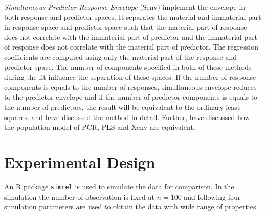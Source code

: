 \documentclass[12pt,3p,authoryear]{elsarticle}
\begin{document}
\emph{Simultaneous Predictor-Response Envelope} (Senv) implement the
envelope in both response and predictor spaces. It separates the
material and immaterial part in response space and predictor space such
that the material part of response does not correlate with the
immaterial part of predictor and the immaterial part of response does
not correlate with the material part of predictor. The regression
coefficients are computed using only the material part of the response
and predictor space. The number of components specified in both of these
methods during the fit influence the separation of these spaces. If the
number of response components is equals to the number of responses,
simultaneous envelope reduces to the predictor envelope and if the
number of predictor components is equals to the number of predictors,
the result will be equivalent to the ordinary least squares.
\citet{cook2015simultaneous} and \citet{cook2018envelope} have discussed
the method in detail. Further, \citet{helland2016algorithms} have
discussed how the population model of PCR, PLS and Xenv are equivalent.

\hypertarget{experimental-design}{\section{Experimental
Design}\label{experimental-design}}

An R \citep{coreR2018} package \texttt{simrel}
\citep{Rimal2018, saebo2015simrel} is used to simulate the data for
comparison. In the simulation the number of observation is fixed at
\(n = 100\) and following four simulation parameters are used to obtain
the data with wide range of properties.
\end{document}
